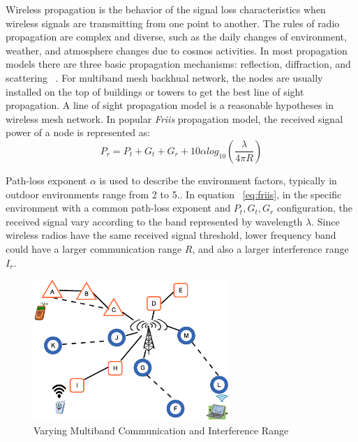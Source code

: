 Wireless propagation is the behavior of the signal loss characteristics when wireless signals are transmitting from one point to another.
The rules of radio propagation are complex and diverse, 
such as the daily changes of environment, weather, and atmosphere changes due to cosmos activities. 
In most propagation models there are three basic propagation mechanisms: reflection, diffraction, and scattering ~\cite{andersen1995propagation}.
For multiband mesh backhual network, the nodes are usually installed on the top of buildings or towers to get the best line of sight propagation. A line of sight propagation model is a reasonable hypotheses in wireless mesh network.
In popular \emph{Friis} propagation model, the received signal power of a node is represented as: 
\begin{equation}
\label{eq:friis}
P_r=P_t+G_t+G_r+10\alpha log_{10}(\frac{\lambda}{4\pi R})
\end{equation}

Path-loss exponent \emph{$\alpha$} is used to describe the environment factors, typically in outdoor environments range from 2 to 5.\cite{camp2006measurement}. 
In equation ~\ref{eq:friis}, in the specific environment with a common path-loss exponent and $P_t,G_t,G_r$ configuration, the received signal vary according to the band represented by wavelength $\lambda$. 
Since wireless radios have the same received signal threshold, lower frequency band could have a larger communication range $R$, and also a larger interference range $I_r$.




\begin{figure}                                                                                                                     
\centering
\includegraphics[width=74mm]{figures/interferencerange}
\vspace{-0.1in}
\caption{Varying Multiband Communication and Interference Range}
\label{fig:interferencerange}
\end{figure}


